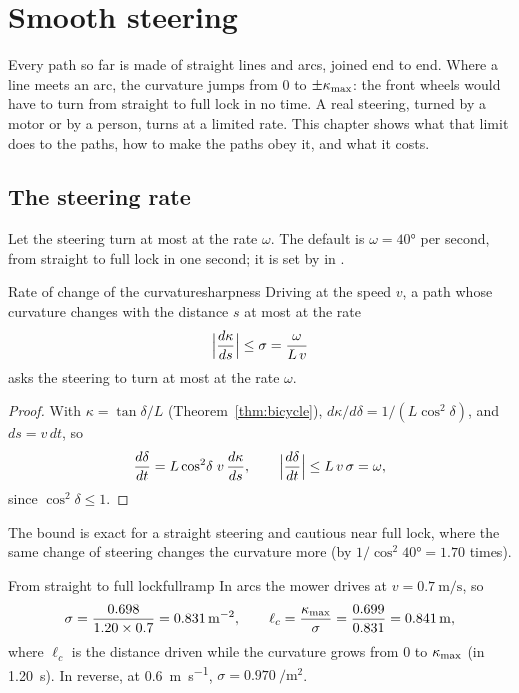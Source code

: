 \chapter{Smooth steering}
\label{ch:smooth}

Every path so far is made of straight lines and arcs, joined end to end. Where
a line meets an arc, the curvature jumps from $0$ to $\pm\kappa_{\max}$: the front
wheels would have to turn from straight to full lock in no time. A real
steering, turned by a motor or by a person, turns at a limited rate. This
chapter shows what that limit does to the paths, how to make the paths obey
it, and what it costs.

\section{The steering rate}

Let the steering turn at most at the rate $\omega$. The default is
$\omega = 40°$ per second, from straight to full lock in one second; it is
set by  in .

\begin{proposition}{Rate of change of the curvature}{sharpness}
  Driving at the speed $v$, a path whose curvature changes with the distance
  $s$ at most at the rate
  \[
    \Bigl|\frac{d\kappa}{ds}\Bigr| \le \sigma = \frac{\omega}{L\, v}
  \]
  asks the steering to turn at most at the rate $\omega$.
\end{proposition}

\begin{proof}
  With $\kappa = \tan\delta / L$ (Theorem~\ref{thm:bicycle}), $d\kappa/d\delta
  = 1/(L\cos^2\delta)$, and $ds = v\,dt$, so
  \[
    \frac{d\delta}{dt} = L \cos^2\!\delta \; v\, \frac{d\kappa}{ds},
    \qquad
    \Bigl|\frac{d\delta}{dt}\Bigr| \le L\, v\, \sigma = \omega,
  \]
  since $\cos^2\delta \le 1$.
\end{proof}

The bound is exact for a straight steering and cautious near full lock,
where the same change of steering changes the curvature more (by
$1/\cos^2 40° = 1.70$ times).

\begin{example}{From straight to full lock}{fullramp}
  In arcs the mower drives at $v = \SI{0.7}{\metre\per\second}$, so
  \[
    \sigma = \frac{0.698}{1.20 \times 0.7} = \SI{0.831}{\per\metre\squared},
    \qquad
    \ell_c = \frac{\kappa_{\max}}{\sigma} = \frac{0.699}{0.831} = \SI{0.841}{\metre},
  \]
  where $\ell_c$ is the distance driven while the curvature grows from $0$
  to $\kappa_{\max}$ (in \SI{1.20}{\second}). In reverse, at
  \SI{0.6}{\metre\per\second}, $\sigma = \SI{0.970}{\per\metre\squared}$.
\end{example}

